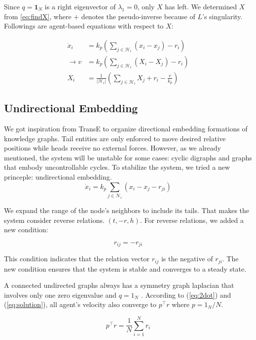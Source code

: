 \documentclass[letterpaper, 10 pt, conference]{ieeeconf}  %
\begin{document}
Since \(q=\mathbf{1}_N\) is a right eigenvector of \(\lambda_1 = 0\), only \(X\) has left. We determined \( X \) from \eqref{eq:findX}, where \( + \) denotes the pseudo-inverse because of \( L \)'s singularity. Followings are agent-based equations with respect to \(X\):

\begin{equation}
    \begin{split}
    \dot{x}_i &= k_p(\sum_{j \in \mathcal{H}_i} (x_i - x_j) -r_i) \\
    \rightarrow v &= k_p(\sum_{j \in \mathcal{H}_i} (X_i - X_j) - r_i) \\
    X_i &= \frac{1}{|\mathcal{H}_i|}(\sum_{j \in \mathcal{H}_i} X_j +r_i-\frac{v}{k_p})
    \end{split}
\end{equation}

\subsection{Undirectional Embedding} 
We got inspiration from TransE to organize directional embedding formations of knowledge graphs. Tail entities are only enforced to move desired relative positions while heads receive no external forces. However, as we already mentioned, the system will be unstable for some cases: cyclic digraphs and graphs that embody uncontrollable cycles. To stabilize the system, we tried a new princeple: undirectional embedding.
\begin{equation}
    \dot{x}_i = k_p \sum_{j \in \mathcal{N}_i} (x_i - x_j - r_{ji})
\end{equation}

We expand the range of the node's neighbors to include its tails. That makes the system consider reverse relations. \( (t, -r, h) \). For reverse relations, we added a new condition: 

\[ r_{ij} = -r_{ji} \]

\noindent This condition indicates that the relation vector \( r_{ij} \) is the negative of \( r_{ji} \). The new condition ensures that the system is stable and converges to a steady state.

A connected undirected graphs always has a symmetry graph laplacian that involves only one zero eigenvalue and \( q = 1_N \) \cite{olfati-saber_consensus_2007}. According to (\ref{eq:2dot}) and (\ref{eq:solution}), all agent's velocity also converge to \(p^\top r\) where \(p = 1_N / N \). 

\[
p^\top r = \frac{1}{N} \sum_{i = 1}^N r_i
\]
\end{document}

